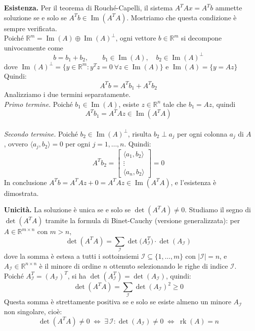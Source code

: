 \documentclass[12pt,a4paper,]{report}
\begin{document}
\begin{dimostrazione}
\textbf{Esistenza.}
Per il teorema di Rouché-Capelli, il sistema $A^TAx = A^Tb$ ammette soluzione
se e solo se $A^Tb \in \operatorname{Im}(A^TA)$. Mostriamo che questa condizione
è sempre verificata.
\\
Poiché $\mathbb{R}^m = \operatorname{Im}(A) \oplus \operatorname{Im}(A)^\perp$,
ogni vettore $b \in \mathbb{R}^m$ si decompone univocamente come
\[
    b = b_1 + b_2,
    \qquad b_1 \in \operatorname{Im}(A),\quad b_2 \in \operatorname{Im}(A)^\perp
\]
dove $\operatorname{Im}(A)^\perp = \{y \in \mathbb{R}^m : y^T z = 0\ \forall z \in \operatorname{Im}(A)\}$
e
$\operatorname{Im}(A) = \{y = Az\} $
Quindi:
\[
    A^T b = A^T b_1 + A^T b_2
\]
Analizziamo i due termini separatamente.
\\
\textit{Primo termine.} Poiché $b_1 \in \operatorname{Im}(A)$, esiste $z \in
\mathbb{R}^n$ tale che $b_1 = Az$, quindi
\[
    A^T b_1 = A^T A z \in \operatorname{Im}(A^T A)
\]
\\
\textit{Secondo termine.} Poiché $b_2 \in \operatorname{Im}(A)^\perp$, risulta
$b_2 \perp a_j$ per ogni colonna $a_j$ di $A$, ovvero
$\langle a_j, b_2 \rangle = 0$ per ogni $j = 1,\dots,n$. Quindi:
\[
    A^T b_2 =
    \begin{bmatrix} \langle a_1, b_2 \rangle \\ \vdots \\ \langle a_n, b_2 \rangle
    \end{bmatrix} = 0
\]
In conclusione $A^T b = A^T A z + 0 = A^T A z \in \operatorname{Im}(A^TA)$,
e l'esistenza è dimostrata.

\bigskip
\noindent\textbf{Unicità.}
La soluzione è unica se e solo se $\det(A^T A) \neq 0$.
Studiamo il segno di $\det(A^T A)$ tramite la formula di Binet-Cauchy (versione
generalizzata): per $A \in \mathbb{R}^{m \times n}$ con $m > n$,
\[
    \det(A^T A)
    = \sum_{\mathcal{I}} \det\!\bigl(A^T_{\mathcal{I}}\bigr)\cdot\det(A_{\mathcal{I}})
\]
dove la somma è estesa a tutti i sottoinsiemi $\mathcal{I} \subseteq \{1,\dots,m\}$
con $|\mathcal{I}|=n$, e $A_{\mathcal{I}} \in \mathbb{R}^{n\times n}$ è il minore
di ordine $n$ ottenuto selezionando le righe di indice $\mathcal{I}$.
\\
Poiché $A^T_{\mathcal{I}} = (A_{\mathcal{I}})^T$, si ha
$\det(A^T_{\mathcal{I}}) = \det(A_{\mathcal{I}})$, quindi:
\[
    \det(A^T A) = \sum_{\mathcal{I}} \det(A_{\mathcal{I}})^2 \geq 0
\]
Questa somma è strettamente positiva se e solo se esiste almeno un minore
$A_{\mathcal{I}}$ non singolare, cioè:
\[
    \det(A^T A) \neq 0
    \;\Longleftrightarrow\;
    \exists\, \mathcal{I} : \det(A_{\mathcal{I}}) \neq 0
    \;\Longleftrightarrow\;
    \operatorname{rk}(A) = n
\]
\end{dimostrazione}
\end{document}
